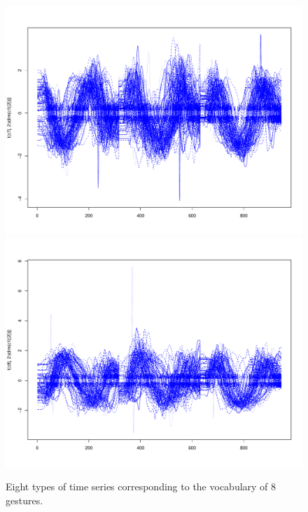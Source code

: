 \begin{figure}[h]
\includegraphics[scale=0.1]{images/c7}
\includegraphics[scale=0.1]{images/c8}

\caption{Eight types of time series corresponding to the vocabulary of 8 gestures.}

\label{geste}
\end{figure}



